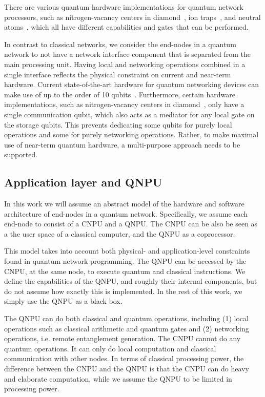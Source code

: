 There are various quantum hardware implementations for quantum network processors, such as nitrogen-vacancy centers in diamond~\cite{Bernien2014}, ion traps~\cite{moehring2007entanglement}, and neutral atoms~\cite{hofmann2012heralded,ritter2012elementary}, which all have different capabilities and gates that can be performed.

In contrast to classical networks, we consider the end-nodes in a quantum network to not have a network interface component that is separated from the main processing unit.
Having local and networking operations combined in a single interface reflects the physical constraint on current and near-term hardware.
Current state-of-the-art hardware for quantum networking devices can make use of up to the order of 10 qubits~\cite{bradley2019solidstate}.
Furthermore, certain hardware implementations, such as nitrogen-vacancy centers in diamond~\cite{Bernien2014}, only have a single communication qubit, which also acts as a mediator for any local gate on the storage qubits.
This prevents dedicating some qubits for purely local operations and some for purely networking operations.
Rather, to make maximal use of near-term quantum hardware, a multi-purpose approach needs to be supported.




\subsection{Application layer and QNPU}
\label{sec:abstract_model}

In this work we will assume an abstract model of the hardware and software architecture of end-nodes in a quantum network.
Specifically, we assume each end-node to consist of a \acf{CNPU} and a \acf{QNPU}.
The \ac{CNPU} can be also be seen as a the user space of a classical computer, and the \ac{QNPU} as a coprocessor.

This model takes into account both physical- and application-level constraints found in quantum network programming.
The \ac{QNPU} can be accessed by the \ac{CNPU}, at the same node, to execute quantum and classical instructions.
We define the capabilities of the \ac{QNPU}, and roughly their internal components, but do not assume how exactly this is implemented.
In the rest of this work, we simply use the \ac{QNPU} as a black box.

The \ac{QNPU} can do both classical and quantum operations, including
    (1) local operations such as classical arithmetic and quantum gates and
    (2) networking operations, i.e. remote entanglement generation.
The \ac{CNPU} cannot do any quantum operations.
It can only do local computation and classical communication with other nodes.
In terms of classical processing power, the difference between the \ac{CNPU} and the \ac{QNPU} is that the \ac{CNPU} can do heavy and elaborate computation, while we assume the \ac{QNPU} to be limited in processing power.

